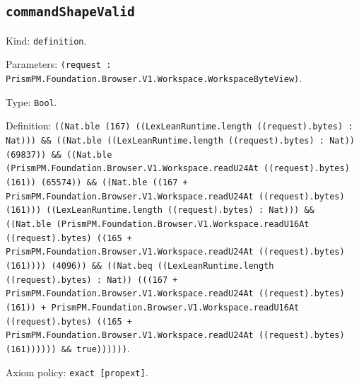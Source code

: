 \documentclass[11pt]{article}
\begin{document}
\subsection*{\texttt{commandShapeValid}}
\noindent Kind: \texttt{definition}.\par
\noindent Parameters: \texttt{(request : PrismPM.Foundation.Browser.V1.Workspace.WorkspaceByteView)}.\par
\noindent Type: \texttt{Bool}.\par
\noindent Definition: \texttt{((Nat.ble (167) ((LexLeanRuntime.length ((request).bytes) : Nat))) \&\& ((Nat.ble ((LexLeanRuntime.length ((request).bytes) : Nat)) (69837)) \&\& ((Nat.ble (PrismPM.Foundation.Browser.V1.Workspace.readU24At ((request).bytes) (161)) (65574)) \&\& ((Nat.ble ((167 + PrismPM.Foundation.Browser.V1.Workspace.readU24At ((request).bytes) (161))) ((LexLeanRuntime.length ((request).bytes) : Nat))) \&\& ((Nat.ble (PrismPM.Foundation.Browser.V1.Workspace.readU16At ((request).bytes) ((165 + PrismPM.Foundation.Browser.V1.Workspace.readU24At ((request).bytes) (161)))) (4096)) \&\& ((Nat.beq ((LexLeanRuntime.length ((request).bytes) : Nat)) (((167 + PrismPM.Foundation.Browser.V1.Workspace.readU24At ((request).bytes) (161)) + PrismPM.Foundation.Browser.V1.Workspace.readU16At ((request).bytes) ((165 + PrismPM.Foundation.Browser.V1.Workspace.readU24At ((request).bytes) (161)))))) \&\& true))))))}.\par
\noindent Axiom policy: \texttt{exact [propext]}.\par
\end{document}
